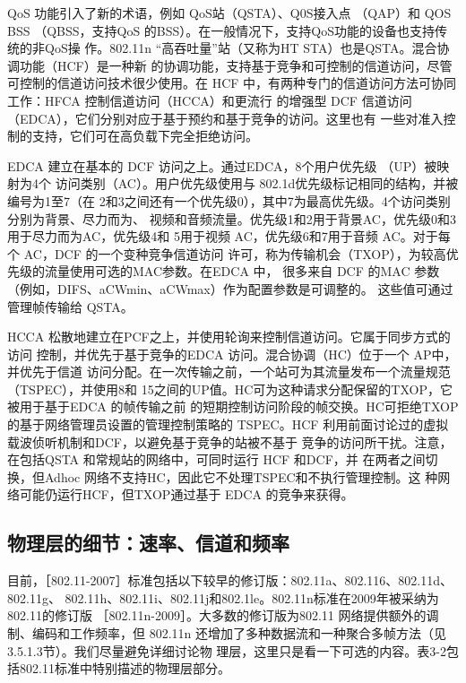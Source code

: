 QoS 功能引入了新的术语，例如 QoS站（QSTA）、Q0S接入点 （QAP）和 QOS BSS
（QBSS，支持QoS 的BSS）。在一般情况下，支持QoS功能的设备也支持传统的非QoS操
作。802.11n “高吞吐量”站（又称为HT STA）也是QSTA。混合协调功能（HCF）是一种新
的协调功能，支持基于竞争和可控制的信道访问，尽管可控制的信道访问技术很少使用。在
HCF 中，有两种专门的信道访问方法可协同工作：HFCA 控制信道访问（HCCA）和更流行
的增强型 DCF 信道访问（EDCA），它们分别对应于基于预约和基于竞争的访问。这里也有
一些对准入控制的支持，它们可在高负载下完全拒绝访问。

EDCA 建立在基本的 DCF 访问之上。通过EDCA，8个用户优先级 （UP）被映射为4个
访问类别（AC）。用户优先级使用与 802.1d优先级标记相同的结构，并被编号为1至7（在
2和3之间还有一个优先级0），其中7为最高优先级。4个访问类别分别为背景、尽力而为、
视频和音频流量。优先级1和2用于背景AC，优先级0和3用于尽力而为AC，优先级4和
5用于视频 AC，优先级6和7用于音频 AC。对于每个 AC，DCF 的一个变种竞争信道访问
许可，称为传输机会（TXOP），为较高优先级的流量使用可选的MAC参数。在EDCA 中，
很多来自 DCF 的MAC 参数（例如，DIFS、aCWmin、aCWmax）作为配置参数是可调整的。
这些值可通过管理帧传输给 QSTA。

HCCA 松散地建立在PCF之上，并使用轮询来控制信道访问。它属于同步方式的访问
控制，并优先于基于竞争的EDCA 访问。混合协调（HC）位于一个 AP中，并优先于信道
访问分配。在一次传输之前，一个站可为其流量发布一个流量规范（TSPEC），并使用8和
15之间的UP值。HC可为这种请求分配保留的TXOP，它被用于基于EDCA 的帧传输之前
的短期控制访问阶段的帧交换。HC可拒绝TXOP的基于网络管理员设置的管理控制策略的
TSPEC。HCF 利用前面讨论过的虚拟载波侦听机制和DCF，以避免基于竞争的站被不基于
竞争的访问所干扰。注意，在包括QSTA 和常规站的网络中，可同时运行 HCF 和DCF，并
在两者之间切换，但Adhoc 网络不支持HC，因此它不处理TSPEC和不执行管理控制。这
种网络可能仍运行HCF，但TXOP通过基于 EDCA 的竞争来获得。

\subsection{物理层的细节：速率、信道和频率}

目前，［802.11-2007］标准包括以下较早的修订版：802.11a、802.116、802.11d、802.11g、
802.11h、802.11i、802.11j和802.1le。802.11n标准在2009年被采纳为802.11的修订版
［802.11n-2009］。大多数的修订版为802.11 网络提供额外的调制、编码和工作频率，但
802.11n 还增加了多种数据流和一种聚合多帧方法（见3.5.1.3节）。我们尽量避免详细讨论物
理层，这里只是看一下可选的内容。表3-2包括802.11标准中特别描述的物理层部分。

